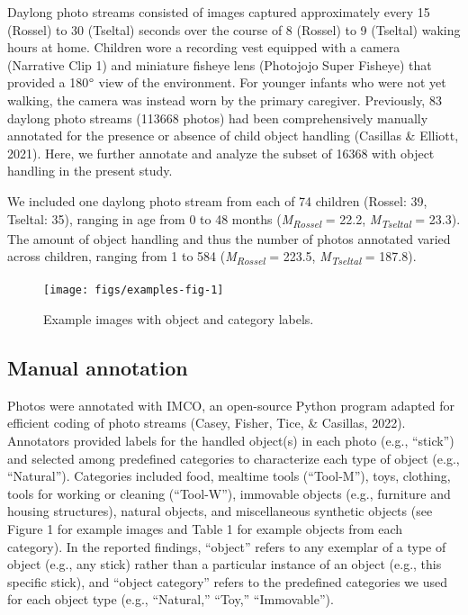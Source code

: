 \documentclass[10pt, letterpaper]{article}
\newenvironment{CodeChunk}{}{}
\begin{document}
Daylong photo streams consisted of images captured approximately every
15 (Rossel) to 30 (Tseltal) seconds over the course of 8 (Rossel) to 9
(Tseltal) waking hours at home. Children wore a recording vest equipped
with a camera (Narrative Clip 1) and miniature fisheye lens (Photojojo
Super Fisheye) that provided a 180\(\text{\textdegree}\) view of the
environment. For younger infants who were not yet walking, the camera
was instead worn by the primary caregiver. Previously, 83 daylong photo
streams (113668 photos) had been comprehensively manually annotated for
the presence or absence of child object handling (Casillas \& Elliott,
2021). Here, we further annotate and analyze the subset of 16368 with
object handling in the present study.

We included one daylong photo stream from each of 74 children (Rossel:
39, Tseltal: 35), ranging in age from 0 to 48 months
(\emph{M}\textsubscript{\emph{Rossel}} = 22.2,
\emph{M}\textsubscript{\emph{Tseltal}} = 23.3). The amount of object
handling and thus the number of photos annotated varied across children,
ranging from 1 to 584 (\emph{M}\textsubscript{\emph{Rossel}} = 223.5,
\emph{M}\textsubscript{\emph{Tseltal}} = 187.8).

\begin{CodeChunk}
\begin{figure}[h]

{\centering \texttt{[image: figs/examples-fig-1]} 

}

\caption[Example images with object and category labels]{Example images with object and category labels.}\label{fig:examples-fig}
\end{figure}
\end{CodeChunk}

\hypertarget{manual-annotation}{%
\subsection{Manual annotation}\label{manual-annotation}}

Photos were annotated with IMCO, an open-source Python program adapted
for efficient coding of photo streams (Casey, Fisher, Tice, \& Casillas,
2022). Annotators provided labels for the handled object(s) in each
photo (e.g., ``stick'') and selected among predefined categories to
characterize each type of object (e.g., ``Natural''). Categories
included food, mealtime tools (``Tool-M''), toys, clothing, tools for
working or cleaning (``Tool-W''), immovable objects (e.g., furniture and
housing structures), natural objects, and miscellaneous synthetic
objects (see Figure 1 for example images and Table 1 for example objects
from each category). In the reported findings, ``object'' refers to any
exemplar of a type of object (e.g., any stick) rather than a particular
instance of an object (e.g., this specific stick), and ``object
category'' refers to the predefined categories we used for each object
type (e.g., ``Natural,'' ``Toy,'' ``Immovable'').
\end{document}
